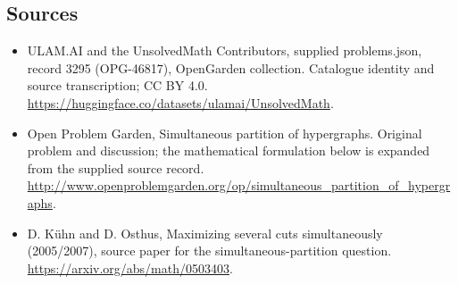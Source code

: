 \documentclass[11pt,a4paper]{article}
\begin{document}
\subsection{Sources}
\begin{itemize}
\item[S1] ULAM.AI and the UnsolvedMath Contributors, supplied problems.json, record 3295 (OPG-46817), OpenGarden collection. Catalogue identity and source transcription; CC BY 4.0.
\url{https://huggingface.co/datasets/ulamai/UnsolvedMath}.
\item[S2] Open Problem Garden, Simultaneous partition of hypergraphs. Original problem and discussion; the mathematical formulation below is expanded from the supplied source record.
\url{http://www.openproblemgarden.org/op/simultaneous_partition_of_hypergraphs}.
\item[S3] D. Kühn and D. Osthus, Maximizing several cuts simultaneously (2005/2007), source paper for the simultaneous-partition question.
\url{https://arxiv.org/abs/math/0503403}.
\end{itemize}
\end{document}
